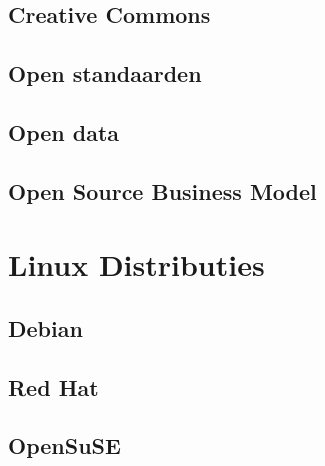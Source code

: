 \documentclass[a4paper,12pt,twoside,openright,titlepage]{book}
\begin{document}
\section{Creative Commons}

\section{Open standaarden}

\section{Open data}

\section{Open Source Business Model}


\chapter{Linux Distributies}

\section{Debian}

\section{Red Hat}

\section{OpenSuSE}


\backmatter
\printindex
\end{document}
